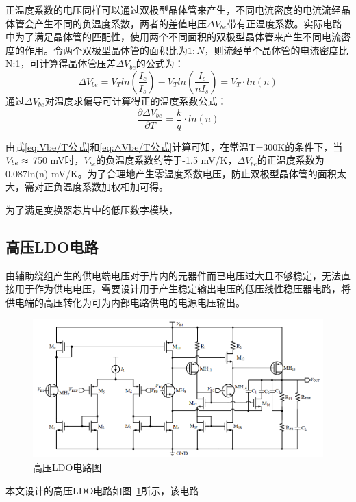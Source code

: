 正温度系数的电压同样可以通过双极型晶体管来产生，不同电流密度的电流流经晶体管会产生不同的负温度系数，两者的差值电压$\varDelta V_{be}$带有正温度系数。实际电路中为了满足晶体管的匹配性，使用两个不同面积的双极型晶体管来产生不同电流密度的作用。令两个双极型晶体管的面积比为$1:N$，则流经单个晶体管的电流密度比N:1，可计算得晶体管压差$\varDelta V_{be}$的公式为：
\begin{equation}
    \label{eq:△Vbe公式}
    \varDelta V_{be} = V_T ln(\frac{I_c}{I_s}) - V_T ln(\frac{I_c}{nI_s}) = V_T \cdot ln(n)
\end{equation}
通过$\varDelta V_{be}$对温度求偏导可计算得正的温度系数公式：
\begin{equation}
    \label{eq:△Vbe/T公式}
    \frac{\partial \varDelta V_{be}}{\partial T} = \frac{k}{q}\cdot ln(n)
\end{equation}


由式\eqref{eq:Vbe/T公式}和\eqref{eq:△Vbe/T公式}计算可知，在常温T=300K的条件下，当$V_{be}\thickapprox $ 750 mV时，$V_{be}$的负温度系数约等于-1.5 mV/K，$\varDelta V_{be}$的正温度系数为0.087ln(n) mV/K。为了合理地产生零温度系数电压，防止双极型晶体管的面积太大，需对正负温度系数加权相加可得。

为了满足变换器芯片中的低压数字模块，



\subsection{高压LDO电路}

由辅助绕组产生的供电端电压对于片内的元器件而已电压过大且不够稳定，无法直接用于作为供电电压，需要设计用于产生稳定输出电压的低压线性稳压器电路，将供电端的高压转化为可为内部电路供电的电源电压输出。
\begin{figure}[htbp] 
    \centering
    \includegraphics[width=0.6\linewidth]{figures/高压LDO.png}
    \caption{高压LDO电路图}
    \label{fig:高压LDO}
\end{figure}

本文设计的高压LDO电路如图~\ref{fig:高压LDO}所示，该电路
\fi


